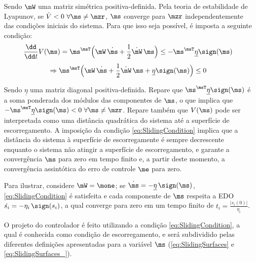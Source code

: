 \documentclass[]{politex}
\begin{document}
Sendo $\mW$ uma matriz simétrica positiva-definida. Pela teoria de estabilidade de Lyapunov, se $\dot{V} < 0 \,\, \forall \ms \neq \mzr$, $\ms$ converge para $\mzr$ independentemente das condi\c{c}\~oes iniciais do sistema. Para que isso seja poss\'ivel, \'e imposta a seguinte condi\c{c}\~ao:
\begin{equation} \label{eq:SlidingCondition}
\frac{\dd}{\dd t} V(\ms) = \ms^\msT \Big( \mW \, \dot{\ms} + \frac{1}{2}  \dot{\mW} \, \ms \Big) \leq -   \ms^\msT \underline{\eta} \sign(\ms) 
\end{equation}
\begin{equation}
\Rightarrow \ms^\msT \Big( \mW \, \dot{\ms} + \frac{1}{2}  \dot{\mW} \, \ms + \underline{\eta} \sign(\ms)  \Big) \leq 0
\end{equation}

Sendo $\underline{\eta}$ uma matriz diagonal positiva-definida. Repare que $\ms^\msT \underline{\eta} \sign(\ms)$ \'e a soma ponderada dos m\'odulos das componentes de $\ms$, o que implica que $-  \ms^\msT \underline{\eta} \sign(\ms) < 0 \,\, \forall \ms \neq \mzr$. Repare tamb\'em que $V(\ms)$ pode ser interpretada como uma distância quadrática do sistema até a superfície de escorregamento. A imposição da condição \eqref{eq:SlidingCondition} implica que a distância do sistema à superfície de escorregamente é sempre decrescente enquanto o sistema não atingir a superfície de escorregamento, e garante a convergência $\ms$ para zero em tempo finito e, a partir deste momento, a convergência assintótica do erro de controle $\me$ para zero. 

Para ilustrar, considere $\mW = \mone$; se $\dot{\ms} = - \underline{\eta} \,\sign(\ms)$,  \eqref{eq:SlidingCondition} \'e satisfeita e cada componente de $\ms$ respeita a EDO $\dot{s_i} = - \eta_i \,\sign(s_i)$, a qual converge para zero em um tempo finito de $t_i = \frac{|s_i(0)|}{\eta_i}$.

O projeto do controlador \'e feito utilizando a condi\c{c}\~ao \eqref{eq:SlidingCondition}, a qual \'e conhecida como condi\c{c}\~ao de escorregamento, e será subdividido pelas diferentes definições apresentadas para a variável $\ms$ (\eqref{eq:SlidingSurfaces} e \eqref{eq:SlidingSurfaces_}).
\end{document}
